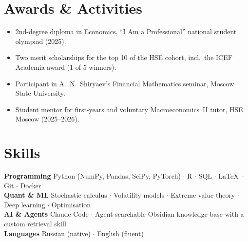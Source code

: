 \documentclass[11pt,a4paper]{article}
\begin{document}
\section{Awards \& Activities}

\begin{itemize}
  \item 2nd-degree diploma in Economics, ``I Am a Professional'' national student olympiad (2025).
  \item Two merit scholarships for the top 10 of the HSE cohort, incl.\ the ICEF Academia award (1 of 5 winners).
  \item Participant in A.~N.~Shiryaev's Financial Mathematics seminar, Moscow State University.
  \item Student mentor for first-years and voluntary Macroeconomics~II tutor, HSE Moscow (2025--2026).
\end{itemize}

\section{Skills}

\textbf{Programming} \quad Python (NumPy, Pandas, SciPy, PyTorch) $\cdot$ R $\cdot$ SQL $\cdot$ \LaTeX\ $\cdot$ Git $\cdot$ Docker\\
\textbf{Quant \& ML} \quad Stochastic calculus $\cdot$ Volatility models $\cdot$ Extreme value theory $\cdot$ Deep learning $\cdot$ Optimisation\\
\textbf{AI \& Agents} \quad Claude Code $\cdot$ Agent-searchable Obsidian knowledge base with a custom retrieval skill\\
\textbf{Languages} \quad Russian (native) $\cdot$ English (fluent)
\end{document}
